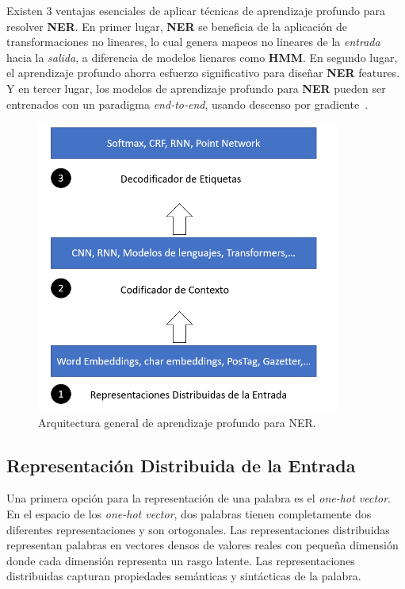 Existen 3 ventajas esenciales de aplicar t\'ecnicas de aprendizaje profundo para resolver \textbf{NER}. En primer lugar, \textbf{NER} se beneficia de la aplicaci\'on de transformaciones no lineares, lo cual genera mapeos no lineares de la \emph{entrada} hacia la \emph{salida}, a diferencia de modelos lienares como \textbf{HMM}. En segundo lugar, el aprendizaje profundo ahorra esfuerzo significativo para dise\~nar \textbf{NER} features. Y en tercer lugar, los modelos de aprendizaje profundo para \textbf{NER} pueden ser entrenados con un paradigma \emph{end-to-end}, usando descenso por gradiente~\cite{li2018survey}.

\begin{figure}[h!]
	\centering
	\includegraphics[width = 10cm]{Imagenes/NERDeep.png}
	\caption{Arquitectura general de aprendizaje profundo para NER.}\label{fig:NerDeepBased}
\end{figure}

\subsection{Representaci\'on Distribuida de la Entrada}

Una primera opci\'on para la representaci\'on de una palabra es el \emph{one-hot vector}. En el espacio de los \emph{one-hot vector}, dos palabras tienen completamente dos diferentes representaciones y son ortogonales. Las representaciones distribuidas representan palabras en vectores densos de valores reales con peque\~na dimensi\'on donde cada dimensi\'on representa un rasgo latente. Las representaciones distribuidas capturan propiedades sem\'anticas y sint\'acticas de la palabra.    

